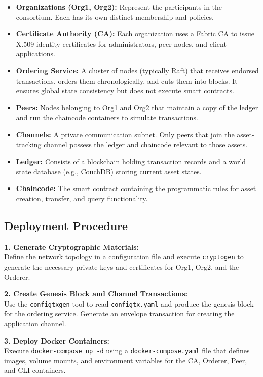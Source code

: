 \documentclass[12pt,a4paper]{article}
\begin{document}
\begin{itemize}
    \item \textbf{Organizations (Org1, Org2):} Represent the participants in the consortium. Each has its own distinct membership and policies.
    \item \textbf{Certificate Authority (CA):} Each organization uses a Fabric CA to issue X.509 identity certificates for administrators, peer nodes, and client applications.
    \item \textbf{Ordering Service:} A cluster of nodes (typically Raft) that receives endorsed transactions, orders them chronologically, and cuts them into blocks. It ensures global state consistency but does not execute smart contracts.
    \item \textbf{Peers:} Nodes belonging to Org1 and Org2 that maintain a copy of the ledger and run the chaincode containers to simulate transactions.
    \item \textbf{Channels:} A private communication subnet. Only peers that join the asset-tracking channel possess the ledger and chaincode relevant to those assets.
    \item \textbf{Ledger:} Consists of a blockchain holding transaction records and a world state database (e.g., CouchDB) storing current asset states.
    \item \textbf{Chaincode:} The smart contract containing the programmatic rules for asset creation, transfer, and query functionality.
\end{itemize}

\subsection{Deployment Procedure}

\textbf{1. Generate Cryptographic Materials:}\\
Define the network topology in a configuration file and execute \texttt{cryptogen} to generate the necessary private keys and certificates for Org1, Org2, and the Orderer.

\textbf{2. Create Genesis Block and Channel Transactions:}\\
Use the \texttt{configtxgen} tool to read \texttt{configtx.yaml} and produce the genesis block for the ordering service. Generate an envelope transaction for creating the application channel.

\textbf{3. Deploy Docker Containers:}\\
Execute \texttt{docker-compose up -d} using a \texttt{docker-compose.yaml} file that defines images, volume mounts, and environment variables for the CA, Orderer, Peer, and CLI containers.
\end{document}
